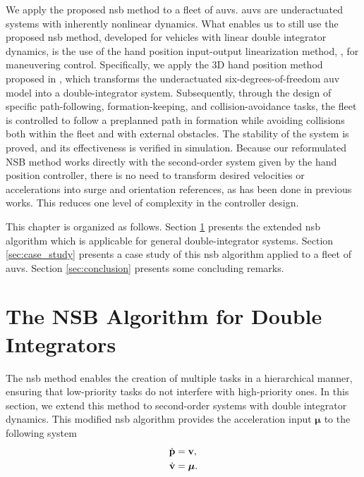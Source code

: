 We apply the proposed \gls{nsb} method to a fleet of \glspl{auv}. \Glspl{auv} are underactuated systems with inherently nonlinear dynamics. What enables us to still use the proposed \gls{nsb} method, developed for vehicles with linear double integrator dynamics, is the use of the hand position input-output linearization method, \cite{restrepo_tracking--formation_2022, cai_adaptive_2015, paliotta_trajectory_2019, matous_trajectory_2023}, for maneuvering control. Specifically, we apply the 3D hand position method proposed in \cite{matous_trajectory_2023}, which transforms the underactuated six-degrees-of-freedom \gls{auv} model into a double-integrator system. Subsequently, through the design of specific path-following, formation-keeping, and collision-avoidance tasks, the fleet is controlled to follow a preplanned path in formation while avoiding collisions both within the fleet and with external obstacles. The stability of the system is proved, and its effectiveness is verified in simulation. Because our reformulated NSB method works directly with the second-order system given by the hand position controller, there is no need to transform desired velocities or accelerations into surge and orientation references, as has been done in previous works. This reduces one level of complexity in the controller design.

This chapter is organized as follows. Section \ref{sec:NSB} presents the extended \gls{nsb} algorithm which is applicable for general double-integrator systems. Section \ref{sec:case_study} presents a case study of this \gls{nsb} algorithm applied to a fleet of \glspl{auv}. Section \ref{sec:conclusion} presents some concluding remarks.

\section{The NSB Algorithm for Double Integrators}\label{sec:NSB}
The \gls{nsb} method enables the creation of multiple tasks in a hierarchical manner, ensuring that low-priority tasks do not interfere with high-priority ones. In this section, we extend this method to second-order systems with double integrator dynamics.
This modified \gls{nsb} algorithm provides the acceleration input $\bm{\mu}$ to the following system
\begin{subequations}
    \begin{align}
        \dot{\mathbf{p}} &= \mathbf{v}, \\
        \dot{\mathbf{v}} &= \bm{\mu}.
    \end{align}
\end{subequations}

